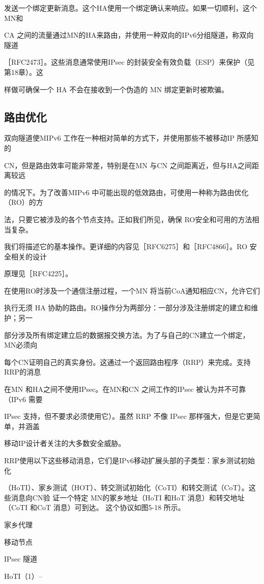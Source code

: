发送一个绑定更新消息。这个HA使用一个绑定确认来响应。如果一切顺利，这个MN和

CA 之间的流量通过MN的HA来路由，并使用一种双向的IPv6分组隧道，称双向隧道

［RFC2473］。这些消息通常使用IPsec 的封装安全有效负载（ESP）来保护（见第18章）。这

样做可确保一个 HA 不会在接收到一个伪造的 MN 绑定更新时被欺骗。

\subsection{路由优化}
双向隧道使MIPv6 工作在一种相对简单的方式下，并使用那些不被移动IP 所感知的

CN，但是路由效率可能非常差，特别是在MN 与CN 之间距离近，但与HA之间距离较远

的情况下。为了改善MIPv6 中可能出现的低效路由，可使用一种称为路由优化（RO）的方

法，只要它被涉及的各个节点支持。正如我们所见，确保 RO安全和可用的方法相当复杂。

我们将描述它的基本操作。更详细的内容见［RFC6275］和［RFC4866］。RO 安全相关的设计

原理见［RFC4225］。

在使用RO时涉及一个通信注册过程，一个MN 将当前CoA通知相应CN，允许它们

执行无须 HA 协助的路由。RO操作分为两部分：一部分涉及注册绑定的建立和维护；另一

部分涉及所有绑定建立后的数据报交换方法。为了与自己的CN建立一个绑定，MN必须向

每个CN证明自己的真实身份。这通过一个返回路由程序（RRP）来完成。支持RRP的消息

在MN 和HA之间不使用IPsec。在MN和CN 之间工作的IPsec 被认为并不可靠（IPv6 需要

IPsec 支持，但不要求必须使用它）。虽然 RRP 不像 IPsec 那样强大，但是它更简单，并涵盖

移动IP设计者关注的大多数安全威胁。

RRP使用以下这些移动消息，它们是IPv6移动扩展头部的子类型：家乡测试初始化

（HoTI）、家乡测试（HOT）、转交测试初始化（CoTI）和转交测试（CoT）。这些消息向CN验
证一个特定 MN的冢乡地址（HoTI 和HoT 消息）和转交地址（CoTI 和CoT 消息）可到达。
这个协议如图5-18 所示。

家乡代理

移动节点

IPsec 隧道

HoTI（1）--

